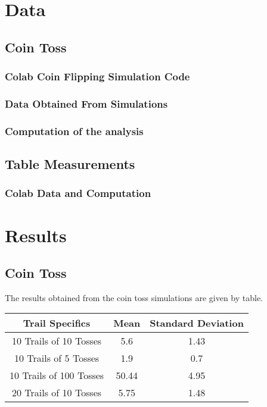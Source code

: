 \documentclass{report}
\begin{document}
    \pagebreak 
    \section{Data}

    \bigbreak \noindent 
    \subsection{Coin Toss}

    \bigbreak \noindent 
    \subsubsection{Colab Coin Flipping Simulation Code}
    \bigbreak \noindent 

    \bigbreak \noindent 
    \subsubsection{Data Obtained From Simulations}
    \bigbreak \noindent 

    \bigbreak \noindent 
    \subsubsection{Computation of the analysis}
    \bigbreak \noindent 

    \bigbreak \noindent 
    \subsection{Table Measurements}
    \bigbreak \noindent 
    \subsubsection{Colab Data and Computation}
    \bigbreak \noindent 

    \bigbreak \noindent 
    \section{Results}
    \bigbreak \noindent 
    \subsection{Coin Toss}
    The results obtained from the coin toss simulations are given by table.
    \bigbreak \noindent 
    \begin{center}
        \begin{tabular}{c|c|c}
            Trail Specifics & Mean & Standard Deviation \\
            \hline
            10 Trails of 10 Tosses  & 5.6 & 1.43\\
            10 Trails of 5 Tosses  &1.9 & 0.7 \\
            10 Trails of 100 Tosses  & 50.44 & 4.95\\
            20 Trails of 10 Tosses  &5.75 & 1.48\\
        \end{tabular}
    \end{center}
\end{document}
